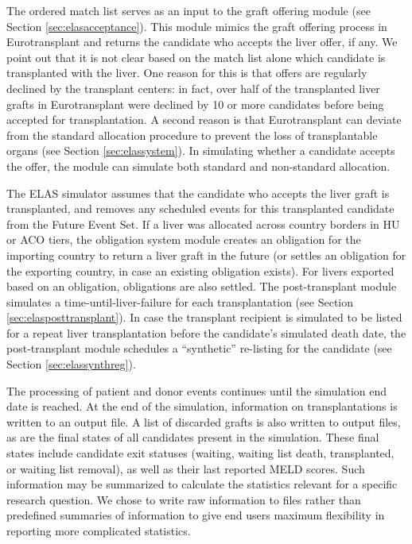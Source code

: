 \documentclass[11pt,twoside,]{book}
\begin{document}
The ordered match list serves as an input to the graft offering module
(see Section \ref{sec:elasacceptance}). This module mimics the graft
offering process in Eurotransplant and returns the candidate who
accepts the liver offer, if any. We point out that it is not clear
based on the match list alone which candidate is transplanted with the liver.
One reason for this is that offers are regularly declined
by the transplant centers: in fact, over half of the transplanted liver
grafts in Eurotransplant were declined by 10 or more candidates before being accepted for transplantation. A second reason is that Eurotransplant can deviate
from the standard allocation procedure to prevent the loss of
transplantable organs (see Section \ref{sec:elassystem}). In simulating whether
a candidate accepts the offer, the module can simulate both standard and non-standard
allocation.

The ELAS simulator assumes that the candidate who accepts the liver
graft is transplanted, and removes any scheduled events for this
transplanted candidate from the Future Event Set. If a liver was allocated
across country borders in HU or ACO tiers, the obligation system module creates
an obligation for the importing country to return a liver graft in the future
(or settles an obligation for the exporting country, in case an existing obligation
exists). For livers exported based
on an obligation, obligations are also settled. The post-transplant module simulates
a time-until-liver-failure for each transplantation (see Section
\ref{sec:elasposttransplant}). In case the transplant recipient
is simulated to be listed for a repeat liver transplantation before
the candidate's simulated death date, the post-transplant module schedules a ``synthetic''
re-listing for the candidate (see Section \ref{sec:elassynthreg}).

The processing of patient and donor events continues until the
simulation end date is reached. At the end of the simulation, information
on transplantations is written to an output file. A list of discarded
grafts is also written to output files, as are the final states
of all candidates present in the simulation. These final states include
candidate exit statuses (waiting, waiting list death, transplanted, or
waiting list removal), as well as their last reported MELD scores. Such
information may be summarized to calculate the
statistics relevant for a specific research question. We chose to
write raw information to files rather than predefined summaries of
information to give end users maximum flexibility in reporting more
complicated statistics.
\end{document}
